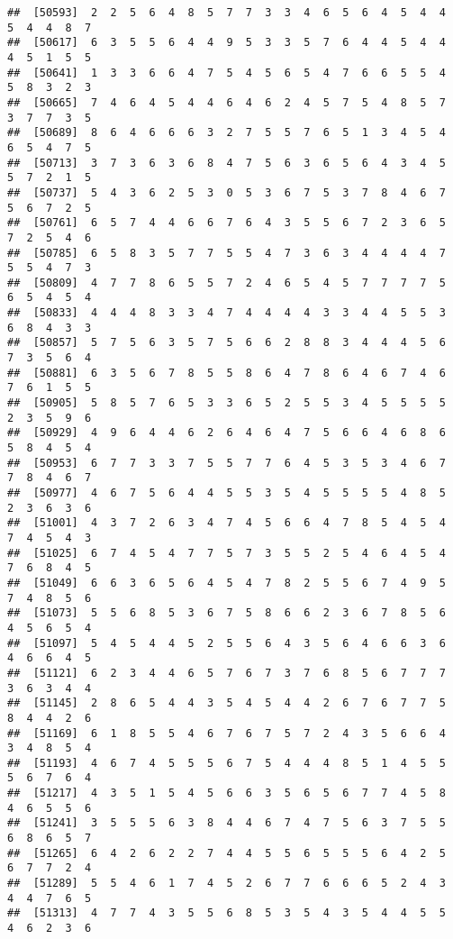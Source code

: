 \documentclass[
]{book}
\begin{document}
\begin{verbatim}
##  [50593]  2  2  5  6  4  8  5  7  7  3  3  4  6  5  6  4  5  4  4  5  4  4  8  7
##  [50617]  6  3  5  5  6  4  4  9  5  3  3  5  7  6  4  4  5  4  4  4  5  1  5  5
##  [50641]  1  3  3  6  6  4  7  5  4  5  6  5  4  7  6  6  5  5  4  5  8  3  2  3
##  [50665]  7  4  6  4  5  4  4  6  4  6  2  4  5  7  5  4  8  5  7  3  7  7  3  5
##  [50689]  8  6  4  6  6  6  3  2  7  5  5  7  6  5  1  3  4  5  4  6  5  4  7  5
##  [50713]  3  7  3  6  3  6  8  4  7  5  6  3  6  5  6  4  3  4  5  5  7  2  1  5
##  [50737]  5  4  3  6  2  5  3  0  5  3  6  7  5  3  7  8  4  6  7  5  6  7  2  5
##  [50761]  6  5  7  4  4  6  6  7  6  4  3  5  5  6  7  2  3  6  5  7  2  5  4  6
##  [50785]  6  5  8  3  5  7  7  5  5  4  7  3  6  3  4  4  4  4  7  5  5  4  7  3
##  [50809]  4  7  7  8  6  5  5  7  2  4  6  5  4  5  7  7  7  7  5  6  5  4  5  4
##  [50833]  4  4  4  8  3  3  4  7  4  4  4  4  3  3  4  4  5  5  3  6  8  4  3  3
##  [50857]  5  7  5  6  3  5  7  5  6  6  2  8  8  3  4  4  4  5  6  7  3  5  6  4
##  [50881]  6  3  5  6  7  8  5  5  8  6  4  7  8  6  4  6  7  4  6  7  6  1  5  5
##  [50905]  5  8  5  7  6  5  3  3  6  5  2  5  5  3  4  5  5  5  5  2  3  5  9  6
##  [50929]  4  9  6  4  4  6  2  6  4  6  4  7  5  6  6  4  6  8  6  5  8  4  5  4
##  [50953]  6  7  7  3  3  7  5  5  7  7  6  4  5  3  5  3  4  6  7  7  8  4  6  7
##  [50977]  4  6  7  5  6  4  4  5  5  3  5  4  5  5  5  5  4  8  5  2  3  6  3  6
##  [51001]  4  3  7  2  6  3  4  7  4  5  6  6  4  7  8  5  4  5  4  7  4  5  4  3
##  [51025]  6  7  4  5  4  7  7  5  7  3  5  5  2  5  4  6  4  5  4  7  6  8  4  5
##  [51049]  6  6  3  6  5  6  4  5  4  7  8  2  5  5  6  7  4  9  5  7  4  8  5  6
##  [51073]  5  5  6  8  5  3  6  7  5  8  6  6  2  3  6  7  8  5  6  4  5  6  5  4
##  [51097]  5  4  5  4  4  5  2  5  5  6  4  3  5  6  4  6  6  3  6  4  6  6  4  5
##  [51121]  6  2  3  4  4  6  5  7  6  7  3  7  6  8  5  6  7  7  7  3  6  3  4  4
##  [51145]  2  8  6  5  4  4  3  5  4  5  4  4  2  6  7  6  7  7  5  8  4  4  2  6
##  [51169]  6  1  8  5  5  4  6  7  6  7  5  7  2  4  3  5  6  6  4  3  4  8  5  4
##  [51193]  4  6  7  4  5  5  5  6  7  5  4  4  4  8  5  1  4  5  5  5  6  7  6  4
##  [51217]  4  3  5  1  5  4  5  6  6  3  5  6  5  6  7  7  4  5  8  4  6  5  5  6
##  [51241]  3  5  5  5  6  3  8  4  4  6  7  4  7  5  6  3  7  5  5  6  8  6  5  7
##  [51265]  6  4  2  6  2  2  7  4  4  5  5  6  5  5  5  6  4  2  5  6  7  7  2  4
##  [51289]  5  5  4  6  1  7  4  5  2  6  7  7  6  6  6  5  2  4  3  4  4  7  6  5
##  [51313]  4  7  7  4  3  5  5  6  8  5  3  5  4  3  5  4  4  5  5  4  6  2  3  6

\end{verbatim}
\end{document}
